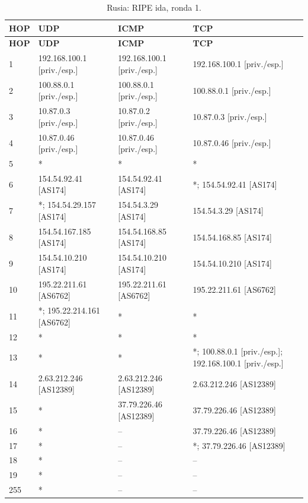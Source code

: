 \endgroup
\begingroup
\fontsize{9}{11}\selectfont
\begin{longtable}{p{0.95cm}p{4.716666666666667cm}p{4.716666666666667cm}p{4.716666666666667cm}}
\caption{Rusia: RIPE ida, ronda 1.}\label{anexo:ripe:37.79.226.46:1} \\
\toprule
\textbf{HOP} & \textbf{UDP} & \textbf{ICMP} & \textbf{TCP} \\ \midrule
\endfirsthead
\toprule
\textbf{HOP} & \textbf{UDP} & \textbf{ICMP} & \textbf{TCP} \\ \midrule
\endhead
1 & 192.168.100.1 [priv./esp.] & 192.168.100.1 [priv./esp.] & 192.168.100.1 [priv./esp.] \\
2 & 100.88.0.1 [priv./esp.] & 100.88.0.1 [priv./esp.] & 100.88.0.1 [priv./esp.] \\
3 & 10.87.0.3 [priv./esp.] & 10.87.0.2 [priv./esp.] & 10.87.0.3 [priv./esp.] \\
4 & 10.87.0.46 [priv./esp.] & 10.87.0.46 [priv./esp.] & 10.87.0.46 [priv./esp.] \\
5 & * & * & * \\
6 & 154.54.92.41 [AS174] & 154.54.92.41 [AS174] & *; 154.54.92.41 [AS174] \\
7 & *; 154.54.29.157 [AS174] & 154.54.3.29 [AS174] & 154.54.3.29 [AS174] \\
8 & 154.54.167.185 [AS174] & 154.54.168.85 [AS174] & 154.54.168.85 [AS174] \\
9 & 154.54.10.210 [AS174] & 154.54.10.210 [AS174] & 154.54.10.210 [AS174] \\
10 & 195.22.211.61 [AS6762] & 195.22.211.61 [AS6762] & 195.22.211.61 [AS6762] \\
11 & *; 195.22.214.161 [AS6762] & * & * \\
12 & * & * & * \\
13 & * & * & *; 100.88.0.1 [priv./esp.]; 192.168.100.1 [priv./esp.] \\
14 & 2.63.212.246 [AS12389] & 2.63.212.246 [AS12389] & 2.63.212.246 [AS12389] \\
15 & * & 37.79.226.46 [AS12389] & 37.79.226.46 [AS12389] \\
16 & * & -- & 37.79.226.46 [AS12389] \\
17 & * & -- & *; 37.79.226.46 [AS12389] \\
18 & * & -- & -- \\
19 & * & -- & -- \\
255 & * & -- & -- \\
\bottomrule
\end{longtable}
\endgroup
\begingroup
